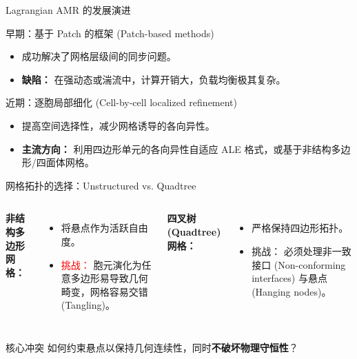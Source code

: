 \documentclass{beamer}
\begin{document}
	\begin{frame}{Lagrangian AMR 的发展演进}
		\begin{block}{早期：基于 Patch 的框架 (Patch-based methods)}
			\begin{itemize}
				\item 成功解决了网格层级间的同步问题。
				\item \textbf{缺陷：} 在强动态或湍流中，计算开销大，负载均衡极其复杂。
			\end{itemize}
		\end{block}
		\vspace{0.3cm}
		\begin{block}{近期：逐胞局部细化 (Cell-by-cell localized refinement)}
			\begin{itemize}
				\item 提高空间选择性，减少网格诱导的各向异性。
				\item \textbf{主流方向：} 利用四边形单元的各向异性自适应 ALE 格式，或基于非结构多边形/四面体网格。
			\end{itemize}
		\end{block}
	\end{frame}
	
	\begin{frame}{网格拓扑的选择：Unstructured vs. Quadtree}
		\begin{columns}
			\textbf{非结构多边形网格：}
			\begin{itemize}
				\item 将悬点作为活跃自由度。
				\item \textcolor{red}{挑战：} 胞元演化为任意多边形易导致几何畸变，网格容易交错 (Tangling)。
			\end{itemize}
			
			\textbf{四叉树 (Quadtree) 网格：}
			\begin{itemize}
				\item 严格保持四边形拓扑。
				\item \textcolor{deepblue}{挑战：} 必须处理非一致接口 (Non-conforming interfaces) 与悬点 (Hanging nodes)。
			\end{itemize}
		\end{columns}
		\vspace{0.5cm}
		\begin{alertblock}{核心冲突}
			如何约束悬点以保持几何连续性，同时\textbf{不破坏物理守恒性}？
		\end{alertblock}
	\end{frame}
	
\end{document}
